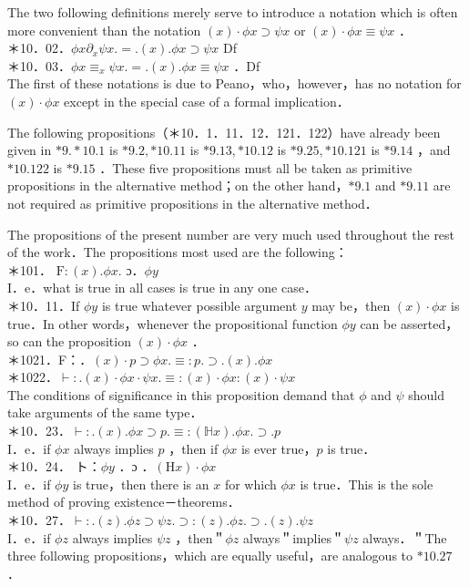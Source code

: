 \documentclass[10pt]{article}
\begin{document}
The two following definitions merely serve to introduce a notation which is often more convenient than the notation $(x) \cdot \phi x \supset \psi x$ or $(x) \cdot \phi x \equiv \psi x$ ．\\
＊10．02．$\phi x \partial_{x} \psi x .=.(x) . \phi x \supset \psi x$ Df\\
＊10．03．$\phi x \equiv_{x} \psi x .=.(x) . \phi x \equiv \psi x$ ．Df\\
The first of these notations is due to Peano，who，however，has no notation for $(x) \cdot \phi x$ except in the special case of a formal implication．

The following propositions（＊10．1．11．12．121．122）have already been given in $* 9 . * 10.1$ is $* 9.2, * 10.11$ is $* 9.13, * 10.12$ is $* 9.25, * 10.121$ is $* 9.14$ ，and $* 10.122$ is $* 9.15$ ．These five propositions must all be taken as primitive propositions in the alternative method；on the other hand，$* 9.1$ and $* 9.11$ are not required as primitive propositions in the alternative method．

The propositions of the present number are very much used throughout the rest of the work．The propositions most used are the following：\\
＊101． $\mathrm{F}:(x) . \phi x$. ɔ．$\phi y$\\
I．e．what is true in all cases is true in any one case．\\
＊10．11．If $\phi y$ is true whatever possible argument $y$ may be，then $(x) \cdot \phi x$ is true．In other words，whenever the propositional function $\phi y$ can be asserted， so can the proposition $(x) \cdot \phi x$ ．\\
＊1021．F：．$(x) \cdot p \supset \phi x . \equiv: p . \supset .(x) . \phi x$\\
＊1022．$\vdash: .(x) \cdot \phi x \cdot \psi x . \equiv:(x) \cdot \phi x:(x) \cdot \psi x$\\
The conditions of significance in this proposition demand that $\phi$ and $\psi$ should take arguments of the same type．\\
＊10．23．$\vdash: .(x) . \phi x \supset p . \equiv:(\mathbb{H} x) . \phi x . \supset . p$\\
I．e．if $\phi x$ always implies $p$ ，then if $\phi x$ is ever true，$p$ is true．\\
＊10．24． ト：$\phi y$ ．ɔ ．$(\mathrm{H} x) \cdot \phi x$\\
I．e．if $\phi y$ is true，then there is an $x$ for which $\phi x$ is true．This is the sole method of proving existence－theorems．\\
＊10．27．$\vdash: .(z) . \phi z \supset \psi z . \supset:(z) . \phi z . \supset .(z) . \psi z$\\
I．e．if $\phi z$ always implies $\psi z$ ，then＂$\phi z$ always＂implies＂$\psi z$ always．＂The three following propositions，which are equally useful，are analogous to $* 10.27$ ．
\end{document}
